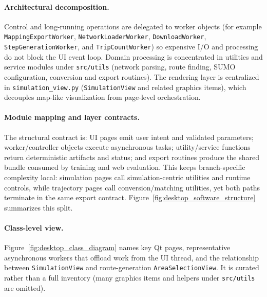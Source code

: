 \paragraph{Architectural decomposition.}
\begin{sloppypar}
Control and long-running operations are delegated to worker objects (for example \texttt{MappingExportWorker}, \texttt{NetworkLoaderWorker}, \texttt{DownloadWorker}, \texttt{StepGenerationWorker}, and \texttt{TripCountWorker}) so expensive I/O and processing do not block the UI event loop. Domain processing is concentrated in utilities and service modules under \texttt{src/utils} (network parsing, route finding, SUMO configuration, conversion and export routines). The rendering layer is centralized in \texttt{simulation\_view.py} (\texttt{SimulationView} and related graphics items), which decouples map-like visualization from page-level orchestration.
\end{sloppypar}

\paragraph{Module mapping and layer contracts.}
The structural contract is: UI pages emit user intent and validated parameters; worker/controller objects execute asynchronous tasks; utility/service functions return deterministic artifacts and status; and export routines produce the shared bundle consumed by training and web evaluation. This keeps branch-specific complexity local: simulation pages call simulation-centric utilities and runtime controls, while trajectory pages call conversion/matching utilities, yet both paths terminate in the same export contract. Figure~\ref{fig:desktop_software_structure} summarizes this split.



\paragraph{Class-level view.}
Figure~\ref{fig:desktop_class_diagram} names key Qt pages, representative asynchronous workers that offload work from the UI thread, and the relationship between \texttt{SimulationView} and route-generation \texttt{AreaSelectionView}. It is curated rather than a full inventory (many graphics items and helpers under \texttt{src/utils} are omitted).



